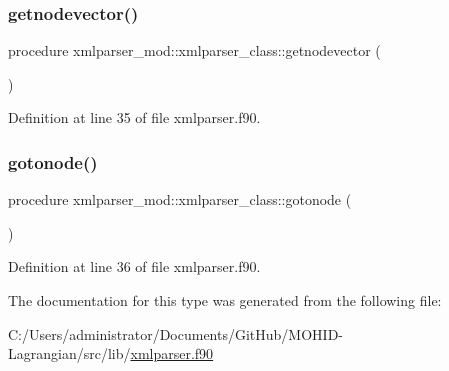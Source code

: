 \subsubsection{\texorpdfstring{getnodevector()}{getnodevector()}}
{\footnotesize\ttfamily procedure xmlparser\+\_\+mod\+::xmlparser\+\_\+class\+::getnodevector (\begin{DoxyParamCaption}{ }\end{DoxyParamCaption})\hspace{0.3cm}{\ttfamily [private]}}



Definition at line 35 of file xmlparser.\+f90.

\mbox{\label{structxmlparser__mod_1_1xmlparser__class_ab8393d12a17d3409c136cdf29d0463b2}} 
\subsubsection{\texorpdfstring{gotonode()}{gotonode()}}
{\footnotesize\ttfamily procedure xmlparser\+\_\+mod\+::xmlparser\+\_\+class\+::gotonode (\begin{DoxyParamCaption}{ }\end{DoxyParamCaption})\hspace{0.3cm}{\ttfamily [private]}}



Definition at line 36 of file xmlparser.\+f90.



The documentation for this type was generated from the following file\+:\begin{DoxyCompactItemize}
\item 
C\+:/\+Users/administrator/\+Documents/\+Git\+Hub/\+M\+O\+H\+I\+D-\/\+Lagrangian/src/lib/\mbox{\hyperlink{xmlparser_8f90}{xmlparser.\+f90}}\end{DoxyCompactItemize}

